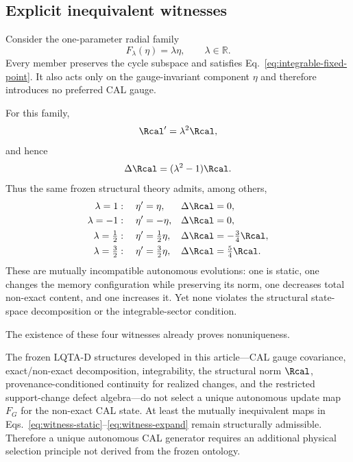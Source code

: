 \subsection{Explicit inequivalent witnesses}

Consider the one-parameter radial family
\begin{equation}
F_{\lambda}(\eta)=\lambda\eta,
\qquad
\lambda\in\mathbb R.
\label{eq:radial-family}
\end{equation}
Every member preserves the cycle subspace and satisfies Eq.~\eqref{eq:integrable-fixed-point}. It also acts only on the gauge-invariant component $\eta$ and therefore introduces no preferred CAL gauge.

For this family,
\begin{equation}
\Rcal' = \lambda^2\Rcal,
\end{equation}
and hence
\begin{equation}
\Delta\Rcal=(\lambda^2-1)\Rcal.
\label{eq:radial-R-change}
\end{equation}
Thus the same frozen structural theory admits, among others,
\begin{align}
\lambda=1 &: \quad \eta' = \eta,
&& \Delta\Rcal=0,
\label{eq:witness-static}\\
\lambda=-1 &: \quad \eta' = -\eta,
&& \Delta\Rcal=0,
\label{eq:witness-flip}\\
\lambda=\tfrac12 &: \quad \eta' = \tfrac12\eta,
&& \Delta\Rcal=-\tfrac34\Rcal,
\label{eq:witness-contract}\\
\lambda=\tfrac32 &: \quad \eta' = \tfrac32\eta,
&& \Delta\Rcal=\tfrac54\Rcal.
\label{eq:witness-expand}
\end{align}
These are mutually incompatible autonomous evolutions: one is static, one changes the memory configuration while preserving its norm, one decreases total non-exact content, and one increases it. Yet none violates the structural state-space decomposition or the integrable-sector condition.

The existence of these four witnesses already proves nonuniqueness.

\begin{theorem}
\label{thm:generator-nogo}
The frozen LQTA-D structures developed in this article---CAL gauge covariance, exact/non-exact decomposition, integrability, the structural norm $\Rcal$, provenance-conditioned continuity for realized changes, and the restricted support-change defect algebra---do not select a unique autonomous update map $F_G$ for the non-exact CAL state. At least the mutually inequivalent maps in Eqs.~\eqref{eq:witness-static}--\eqref{eq:witness-expand} remain structurally admissible. Therefore a unique autonomous CAL generator requires an additional physical selection principle not derived from the frozen ontology.
\end{theorem}

